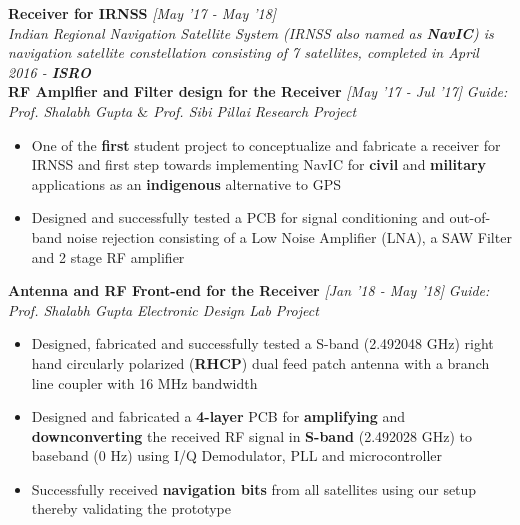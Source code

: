 \documentclass[11pt]{article}%
\begin{document}
{\flushleft \bf \large{Receiver for IRNSS}} \hfill {{{\em{[May '17 - May '18]}}}} \\
\vspace{-7mm}
{\flushleft \em{Indian Regional Navigation Satellite System (IRNSS also named as \textbf{NavIC}) is navigation satellite \nohyphens{constellation} consisting of 7 satellites, completed in April 2016 - \textbf{ISRO}}}\\
\vspace{-5.5mm}
\flushleft \textbf{RF Amplfier and Filter design for the Receiver}  \hfill{\em{[May '17 - Jul '17]}}
\vspace{-2mm}
{\flushleft \em{Guide: Prof. Shalabh Gupta $\&$ Prof. Sibi Pillai}}  \hfill{\em{Research Project}} 
\vspace{-1mm}
\begin{itemize}[leftmargin=*]
	\setlength\itemsep{0.01em}
    \vspace{-1mm}
    \item One of the \textbf{first} student project to conceptualize and fabricate a receiver for IRNSS and first step towards implementing NavIC for \textbf{civil} and \textbf{military} applications as an \textbf{indigenous} alternative to GPS
    \item Designed and successfully tested a PCB for signal conditioning and out-of-band noise rejection consisting of a Low Noise Amplifier (LNA), a SAW Filter and 2 stage RF amplifier
\end{itemize}

\vspace{-4mm}
\flushleft \textbf{Antenna and RF Front-end for the Receiver}  \hfill{\em{[Jan '18 - May '18]}}
\vspace{-2mm}
{\flushleft \em{Guide: Prof. Shalabh Gupta}} \hfill{\em{Electronic Design Lab Project}} 
\vspace{-1mm}
\begin{itemize}[leftmargin=*]
	\setlength\itemsep{0.01em}
    \vspace{-1mm}	
     \item Designed, fabricated and successfully tested a S-band (2.492048 GHz) right hand circularly polarized (\textbf{RHCP}) dual feed patch antenna with a branch line coupler with 16 MHz bandwidth
    \item Designed and fabricated a \textbf{4-layer} PCB for \textbf{amplifying} and \textbf{downconverting} the received RF signal in \textbf{S-band} (2.492028 GHz) to baseband (0 Hz) using I/Q Demodulator, PLL and microcontroller 
    \item Successfully received \textbf{navigation bits} from all satellites using our setup thereby validating the prototype
\end{itemize}
\end{document}
